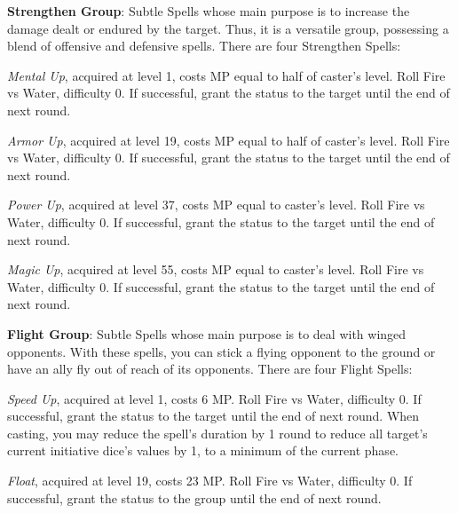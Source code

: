 \begin{multicols}{2}
    \ffcrystal[type=level,height=8pt]
   
    \textbf{Strengthen Group}: Subtle Spells whose main purpose is to increase the damage dealt or endured by the target. Thus, it is a versatile group, possessing a blend of offensive and defensive spells. There are four Strengthen Spells:
    
    \textit{Mental Up}, acquired at level 1, costs MP equal to half of caster's level. Roll Fire vs Water, difficulty 0. If successful, grant the  status to the target until the end of next round.

    \textit{Armor Up}, acquired at level 19, costs MP equal to half of caster's level. Roll Fire vs Water, difficulty 0. If successful, grant the  status to the target until the end of next round.
    
    \textit{Power Up}, acquired at level 37, costs MP equal to caster's level. Roll Fire vs Water, difficulty 0. If successful, grant the  status to the target until the end of next round.
    
    \textit{Magic Up}, acquired at level 55, costs MP equal to caster's level. Roll Fire vs Water, difficulty 0. If successful, grant the  status to the target until the end of next round.
 
    \ffcrystal[type=level,height=8pt]
   
    \textbf{Flight Group}: Subtle Spells whose main purpose is to deal with winged opponents. With these spells, you can stick a flying opponent to the ground or have an ally fly out of reach of its opponents. There are four Flight Spells:
    
    \textit{Speed Up}, acquired at level 1, costs 6 MP\@. Roll Fire vs Water, difficulty 0. If successful, grant the  status to the target until the end of next round. When casting, you may reduce the spell's duration by 1 round to reduce all target's current initiative dice's values by 1, to a minimum of the current phase.
    
    \textit{Float}, acquired at level 19, costs 23 MP\@. Roll Fire vs Water, difficulty 0. If successful, grant the  status to the group until the end of next round.
    

\end{multicols}
